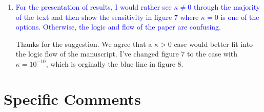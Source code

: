 \documentclass[11pt]{article}
\begin{document}
\begin{enumerate}
Thanks for suggesting a discussion of Maxwell time. As pointed out by reviewer 1, the characteristic timescale of blister relaxation can be close to the Maxwell time of ice, which ranges from days to weeks. While an elastic bending model can adequately capture the quick formation (hours) of blisters following lake drainage events, the viscous rheology is required to accurately estimate the following relaxation on a weekly timescale. Therefore, a viscoelastic bending model is more appropriate compared with the current elastic model. However, since the model presented here is an initial attempt which leverages many asymptotic results from previous theoretical studies based on the elastic bending theory, we will leave the viscoelastic model for future work.

\item \textcolor{blue}{For the presentation of results, I would rather see $\kappa \neq 0$ through the majority of
the text and then show the sensitivity in figure 7 where $\kappa = 0$ is one of the options.
Otherwise, the logic and flow of the paper are confusing.}

Thanks for the suggestion. We agree that a $\kappa>0$ case would better fit into the logic flow of the manuscript. I've changed figure 7 to the case with $\kappa=10^{-10}$, which is orginally the blue line in figure 8.

\end{enumerate}

\section{Specific Comments}
\end{document}
